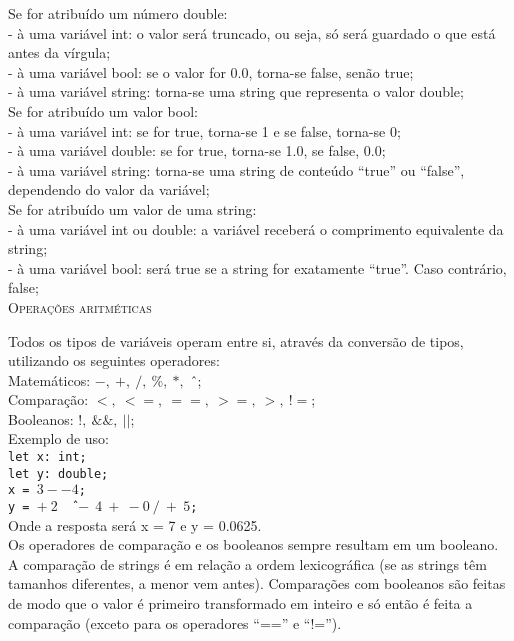 \documentclass[12pt,a4paper]{article}
\begin{document}
Se for atribuído um número double:\\[0.15cm]
- à uma variável int: o valor será truncado, ou seja, só será guardado o que está antes da vírgula;\\
- à uma variável bool: se o valor for 0.0, torna-se false, senão true;\\
- à uma variável string: torna-se uma string que representa o valor double;\\[0.3cm]

Se for atribuído um valor bool:\\[0.15cm]
- à uma variável int: se for true, torna-se 1 e se false, torna-se 0;\\
- à uma variável double: se for true, torna-se 1.0, se false, 0.0;\\
- à uma variável string: torna-se uma string de conteúdo ``true'' ou ``false'', dependendo do valor da variável;\\[0.3cm]

Se for atribuído um valor de uma string:\\[0.15cm]
- à uma variável int ou double: a variável receberá o comprimento equivalente da string;\\
- à uma variável bool: será true se a string for exatamente ``true''. Caso contrário, false;\\[0.3cm]

\hypertarget{label3}{\Large{\textsc{Operações aritméticas}}}\\
\normalsize

Todos os tipos de variáveis operam entre si, através da conversão de tipos, utilizando os seguintes operadores:\\[0.2cm]
Matemáticos: $-,\ +,\ /,\ \%,\ *,$ \^\ ;\\
Comparação: $<,\ <=,\ ==,\ >=,\ >,\ !=$;\\
Booleanos: $!,\ \&\&,\ ||$;\\[0.6cm]
Exemplo de uso:\\[0.3cm]
\texttt{\indent let x: int;\\
\indent let y: double;\\
\indent x = $3--4$;\\
\indent y = $+\ 2$ \^\ $\ -\ 4\ +\ -0\ /\ +\ 5$;}\\[0.5cm]
Onde a resposta será x = 7 e y = 0.0625.\\


Os operadores de comparação e os booleanos sempre resultam em um booleano. A comparação de strings é em relação a ordem lexicográfica (se as strings têm tamanhos diferentes, a menor vem antes). Comparações com booleanos são feitas de modo que o valor é primeiro transformado em inteiro e só então é feita a comparação (exceto para os operadores ``=='' e ``!='').\\
\end{document}
